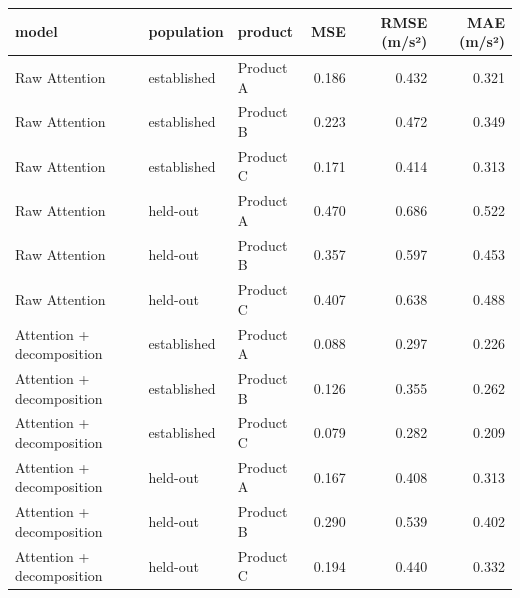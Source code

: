 \begin{tabular}{lllrrr}
\toprule
model & population & product & MSE & RMSE (m/s²) & MAE (m/s²) \\
\midrule
Raw Attention & established & Product A & 0.186 & 0.432 & 0.321 \\
Raw Attention & established & Product B & 0.223 & 0.472 & 0.349 \\
Raw Attention & established & Product C & 0.171 & 0.414 & 0.313 \\
Raw Attention & held-out & Product A & 0.470 & 0.686 & 0.522 \\
Raw Attention & held-out & Product B & 0.357 & 0.597 & 0.453 \\
Raw Attention & held-out & Product C & 0.407 & 0.638 & 0.488 \\
Attention + decomposition & established & Product A & 0.088 & 0.297 & 0.226 \\
Attention + decomposition & established & Product B & 0.126 & 0.355 & 0.262 \\
Attention + decomposition & established & Product C & 0.079 & 0.282 & 0.209 \\
Attention + decomposition & held-out & Product A & 0.167 & 0.408 & 0.313 \\
Attention + decomposition & held-out & Product B & 0.290 & 0.539 & 0.402 \\
Attention + decomposition & held-out & Product C & 0.194 & 0.440 & 0.332 \\
\bottomrule
\end{tabular}
